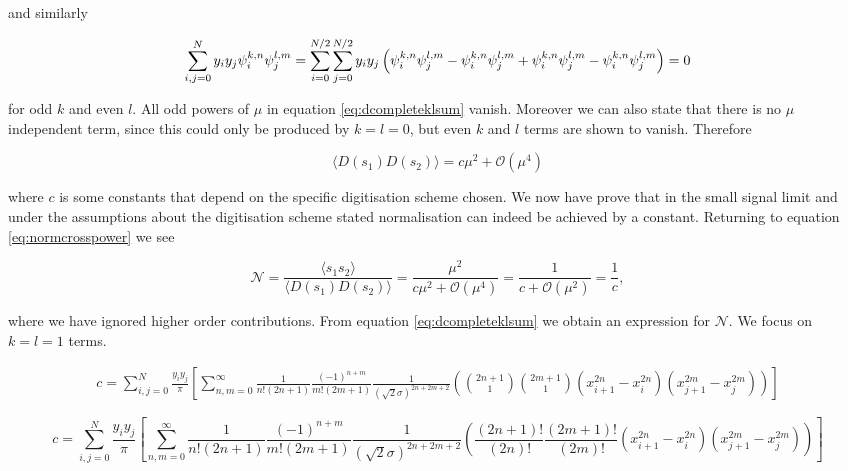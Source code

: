 \documentclass[apj]{emulateapj}
\begin{document}
and similarly

\begin{equation}
\sum_{i,j = 0}^N y_i y_j \psi_i^{k, n} \psi_j^{l, m} = \sum_{i = 0}^{N/2}\sum_{j = 0}^{N/2} y_i y_j \left( \psi_i^{k, n} \psi_j^{l, m} - \psi_{i}^{k, n} \psi_j^{l, m} + \psi_i^{k, n} \psi_{j}^{l, m} - \psi_{i}^{k, n} \psi_{j}^{l, m} \right) = 0\\
\end{equation}

for odd $k$ and even $l$. All odd powers of $\mu$ in equation \ref{eq:dcompleteklsum} vanish. Moreover we can also state that there is no $\mu$ independent term, since this could only be produced by $k=l=0$, but even $k$ and $l$ terms are shown to vanish. Therefore

\begin{equation}
\langle D(s_1) D(s_2) \rangle = c \mu^2 + \mathcal{O}(\mu^4)
\end{equation}

where $c$ is some constants that depend on the specific digitisation scheme chosen. We now have prove that in the small signal limit and under the assumptions about the digitisation scheme stated normalisation can indeed be achieved by a constant. Returning to equation \ref{eq:normcrosspower} we see

\begin{equation}
\mathcal{N}  = \frac{\langle s_1 s_2 \rangle}{\langle D(s_1) D(s_2) \rangle} = \frac{\mu^2}{c \mu^2 + \mathcal{O}(\mu^4)} = \frac{1}{c + \mathcal{O}(\mu^2)} = \frac{1}{c},
\end{equation}

where we have ignored higher order contributions. From equation \ref{eq:dcompleteklsum} we obtain an expression for $\mathcal{N}$. We focus on $k=l=1$ terms.

\begin{equation}
\begin{aligned}
c = \sum_{i,j=0}^N  \frac{y_i y_j}{\pi} \left[ \sum_{n,m = 0}^\infty \frac{1}{n! (2n+1)} \frac{(-1)^{n+m}}{m! (2m+1)} \frac{1}{(\sqrt{2}\sigma)^{2n+2m+2}} \left( {2n+1 \choose 1} {2m+1 \choose 1} ( x_{i+1}^{2n} - x_{i}^{2n} ) ( x_{j+1}^{2m} - x_{j}^{2m} ) \right) \right]
\end{aligned}
\end{equation}

\begin{equation}
c = \sum_{i,j=0}^N  \frac{y_i y_j}{\pi} \left[ \sum_{n,m = 0}^\infty \frac{1}{n! (2n+1)} \frac{(-1)^{n+m}}{m! (2m+1)} \frac{1}{(\sqrt{2}\sigma)^{2n+2m+2}} \left( \frac{(2n+1)!}{(2n)!} \frac{(2m+1)!}{(2m)!} ( x_{i+1}^{2n} - x_{i}^{2n} ) ( x_{j+1}^{2m} - x_{j}^{2m} ) \right) \right]
\end{equation}
\end{document}
